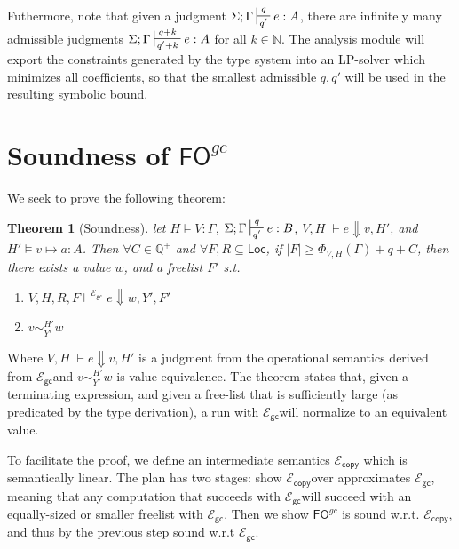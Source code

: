 \documentclass{easychair}
\newtheorem{theorem}{Theorem}
\newcommand{\ms}[1]{\ensuremath{\mathsf{#1}}}
\newcommand{\veq}[4]{#3 \sim^{#1}_{#2} #4}
\newcommand{\fogc}{\ms{FO}^{gc}}
\newcommand{\gcSem}{\ensuremath{\mathcal{E}_{\ms{gc}}}}
\newcommand{\copySem}{\ensuremath{\mathcal{E}_{\ms{copy}}}}
\theoremstyle{definition}
\begin{document}
Futhermore, note that given a judgment $\Sigma;\Gamma \sststile{q'}{q} e : A$, there are 
infinitely many admissible judgments $\Sigma;\Gamma \sststile{q' + k}{q + k} e : A$ 
for all $k \in \mathbb{N}$. The analysis module will export the constraints generated 
by the type system into an LP-solver which minimizes all coefficients, so that the 
smallest admissible $q,q'$ will be used in the resulting symbolic bound.

\section{Soundness of $\fogc$}

We seek to prove the following theorem: 

\begin{theorem}[Soundness]
\label{itm:soundness} let $H \vDash V : \Gamma$, $\Sigma; \Gamma \sststile{q'}{q} e : B$,
$V,H \; \vdash e \Downarrow v, H'$, and $H' \vDash v \mapsto a : A$.
Then $\forall C \in \mathbb{Q}^{+}$ and $\forall F,R \subseteq \ms{Loc}$,
if $|F| \ge \Phi_{V,H}(\Gamma) + q + C$,
then there exists a value $w$, and a freelist $F'$ s.t.
\begin{enumerate}
	\item $V,H,R,F \vdash^{\gcSem} e \Downarrow w, Y', F'$
	\item $\veq{H'}{Y'}{v}{w}$
\end{enumerate}
\end{theorem}

Where $V,H \; \vdash e \Downarrow v, H'$ is a judgment from the operational semantics
derived from \gcSem and $\veq{H'}{Y'}{v}{w}$ is value equivalence. The theorem states that,
given a terminating expression,
and given a free-list that is sufficiently large (as predicated by the type derivation), 
a run with \gcSem will normalize to an equivalent value.

To facilitate the proof, we define an intermediate semantics \copySem 
which is semantically linear. The plan has two stages: show \copySem over 
approximates \gcSem, meaning that any computation that succeeds with \gcSem will succeed with 
an equally-sized or smaller freelist with \gcSem. Then we 
show $\fogc$ is sound w.r.t. \copySem, and thus by the previous step sound w.r.t \gcSem.
\end{document}
